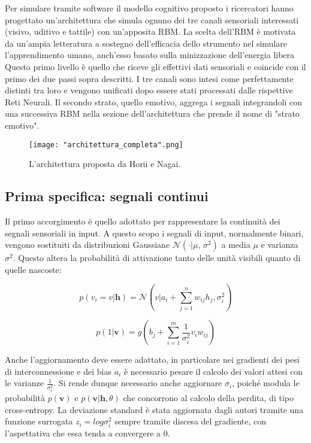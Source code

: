 \documentclass[10pt,letterpaper]{article}
\begin{document}
Per simulare tramite software il modello cognitivo proposto i ricercatori hanno progettato un'architettura che simula ognuno dei tre canali sensoriali interessati (visivo, uditivo e tattile) con un'apposita RBM. La scelta dell'RBM è motivata da un'ampia letteratura a sostegno dell'efficacia dello strumento nel simulare l'apprendimento umano, anch'esso basato sulla minizzazione dell'energia libera Questo primo livello è quello che riceve gli effettivi dati sensoriali e coincide con il primo dei due passi sopra descritti. I tre canali sono  intesi come perfettamente distinti tra loro e vengono unificati dopo essere stati processati dalle rispettive Reti Neurali. Il secondo strato, quello emotivo, aggrega i segnali integrandoli con una successiva RBM nella sezione dell'architettura che prende il nome di "strato emotivo".

\begin{figure}[h!]
	\centering
	\texttt{[image: "architettura\_completa".png]}
	\caption{L'architettura proposta da Horii e Nagai.}
	\label{fig:screen3}
\end{figure}

\newpage
\subsection{Prima specifica: segnali continui}
Il primo accorgimento è quello adottato per rappresentare la continuità dei segnali sensoriali in input. A questo scopo i segnali di input, normalmente binari, vengono sostituiti da distribuzioni Gaussiane $\mathcal{N}( \cdot | \mu,\,\sigma^{2})$ a media $\mu$ e varianza $\sigma^{2}$. Questo altera la probabilità di attivazione tanto delle unità visibili quanto di quelle nascoste:

\begin{equation}
p(v_i = v|\textbf{h}) = \mathcal{N}(v|a_i + \sum_{j=1}^{n}w_{ij}h_j,\sigma_i^2)
\end{equation}

\begin{equation}
p(1|\textbf{v}) = g(b_j + \sum_{i=1}^{m}\frac{1}{\sigma_i^2}v_iw_{ij})
\end{equation}

Anche l'aggiornamento deve essere adattato, in particolare nei gradienti dei pesi di interconnessione e dei bias $a_i$ è necessario pesare il calcolo dei valori attesi con le varianze $\frac{1}{\sigma_i^2}$. Si rende dunque necessario anche aggiornare $\sigma_i$, poiché modula le probabilità $p(\textbf{v})$ e $p(\textbf{v}|\textbf{h}, \theta)$ che concorrono al calcolo della perdita, di tipo cross-entropy. La deviazione standard è stata aggiornata dagli autori tramite una funzione surrogata $z_i = log\sigma_i^2$ sempre tramite discesa del gradiente, con l'aspettativa che essa tenda a convergere a 0.
\end{document}
